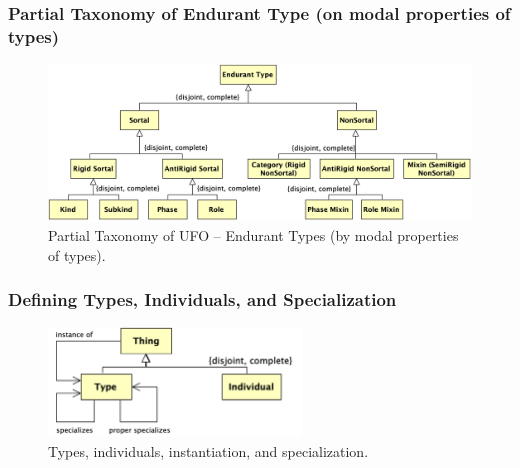 \documentclass{article}
\newcommand{\BeginEndurantTaxonomyOfPropertiesBegin}{194}
\newcommand{\EndEndurantTaxonomyOfPropertiesEnd}{271}
\newcommand{\BeginInstantationAndSpecialzation}{273}
\newcommand{\EndInstantationAndSpecialzation}{356}
\begin{document}
\subsubsection{Partial Taxonomy of Endurant Type (on modal properties of types)}

\begin{figure}[ht]
    \centering
    \includegraphics[width=\textwidth]{diagrams/Endurant_Type_Properties_Diagram.png}
    \caption{Partial Taxonomy of UFO -- Endurant Types (by modal properties of types).}
    \label{fig:ufo_taxonomy_endurant_types_properties}
\end{figure}



\subsubsection{Defining Types, Individuals, and Specialization}

\begin{figure}[ht]
    \centering
    \includegraphics[width=0.6\textwidth]{diagrams/Instantiation_Diagram.png}
    \caption{Types, individuals, instantiation, and specialization.}
    \label{fig:instantiation_and_specialization}
\end{figure}


\end{document}
